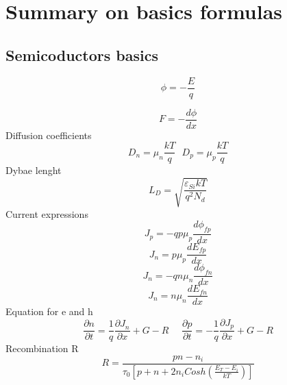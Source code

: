 \chapter{Summary on basics formulas}


\raggedright
\section{Semicoductors basics}

\begin{equation}
\phi=-\frac{E}{q}
\end{equation}


\begin{equation}
F=-\frac{d\phi}{dx}
\end{equation}
\vspace{3mm}
Diffusion coefficients\\
\begin{equation}
D_n=\mu_n\frac{kT}{q}\ \ \ D_p=\mu_p\frac{kT}{q}
\end{equation}
\vspace{3mm}
Dybae lenght\\
\begin{equation}
L_D=\sqrt{\frac{\varepsilon_{Si}kT}{q^2N_d}}
\end{equation}
\vspace{3mm}
Current expressions\\
\begin{equation}
J_p=-qp\mu_p\frac{d\phi_{fp}}{dx}
\end{equation}
\begin{equation}
J_n=p\mu_p\frac{dE_{fp}}{dx}
\end{equation}  
\begin{equation}
J_n=-qn\mu_n\frac{d\phi_{fn}}{dx}
\end{equation}
\begin{equation}
J_n=n\mu_n\frac{dE_{fn}}{dx}
\end{equation} 
\vspace{3mm}
Equation for e and h \\
\begin{equation}
\frac{\partial n}{\partial t}=\frac{1}{q}\frac{\partial J_n}{\partial x}+G-R \ \ \ \ \ \ \frac{\partial p}{\partial t}=-\frac{1}{q}\frac{\partial J_p}{\partial x}+G-R
\end{equation}
\vspace{3mm}
Recombination R\\
\begin{equation}
R=\frac{pn-n_i}{\tau_0\left[p+n+2n_iCosh(\frac{E_T-E_i}{kT})\right]}
\end{equation}



